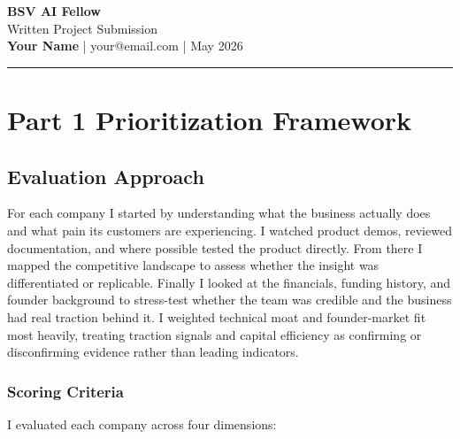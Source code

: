 \documentclass[11pt, letterpaper]{article}
\begin{document}
\begin{center}
  {\fontsize{22}{26}\selectfont\bfseries\color{navy} BSV AI Fellow}\\[0.4em]
  {\fontsize{13}{16}\selectfont\color{midgray} Written Project Submission}\\[1.2em]
  {\normalsize\textbf{Your Name}} \quad\textcolor{rulegray}{|}\quad
  {\normalsize\textcolor{midgray}{your@email.com}} \quad\textcolor{rulegray}{|}\quad
  {\normalsize\textcolor{midgray}{May 2026}}
\end{center}

\vspace{0.5em}
\textcolor{rulegray}{\rule{\linewidth}{0.6pt}}
\vspace{1.2em}

\section{Part 1 \quad Prioritization Framework}

\subsection{Evaluation Approach}

For each company I started by understanding what the business actually does and
what pain its customers are experiencing. I watched product demos, reviewed
documentation, and where possible tested the product directly. From there I
mapped the competitive landscape to assess whether the insight was differentiated
or replicable. Finally I looked at the financials, funding history, and founder
background to stress-test whether the team was credible and the business had
real traction behind it. I weighted technical moat and founder-market fit most
heavily, treating traction signals and capital efficiency as confirming or
disconfirming evidence rather than leading indicators.

\subsubsection{Scoring Criteria}

I evaluated each company across four dimensions:
\end{document}
